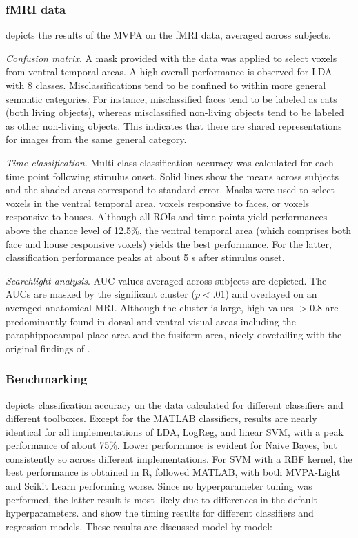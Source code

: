 \documentclass[utf8]{frontiersSCNS} %
\begin{document}
\subsubsection{fMRI data}

 depicts the results of the MVPA on the fMRI data, averaged across subjects.

\textit{Confusion matrix}. A mask provided with the data was applied to select voxels from ventral temporal areas.
A high overall performance is observed for LDA with 8 classes. Misclassifications tend to be confined to within more general semantic categories. For instance, misclassified faces tend to be labeled as cats (both living objects), whereas misclassified non-living objects tend to be labeled as other non-living objects. This indicates that there are shared representations for images from the same general category.

\textit{Time classification}. Multi-class classification accuracy was calculated for each time point following stimulus onset. Solid lines show the means across subjects and the shaded areas correspond to standard error. Masks were used to select voxels in the ventral temporal area, voxels responsive to faces, or voxels responsive to houses. Although all ROIs and time points yield performances above the chance level of 12.5\%, the ventral temporal area (which comprises both face and house responsive voxels) yields the best performance. For the latter, classification performance peaks at about 5 s after stimulus onset.

\textit{Searchlight analysis}. AUC values averaged across subjects are depicted. The AUCs are masked by the significant cluster ($p < .01$) and overlayed on an averaged anatomical MRI. Although the cluster is large, high values $>0.8$ are predominantly found in dorsal and ventral visual areas including the paraphippocampal place area and the fusiform area, nicely dovetailing with the original findings of \cite{Haxby2001}.

\subsubsection{Benchmarking}

 depicts classification accuracy on the \cite{Wakeman2015ADataset} data calculated for different classifiers and different toolboxes. Except for the MATLAB classifiers, results are nearly identical  for all implementations of LDA, LogReg, and linear SVM, with a peak performance of about 75\%. Lower performance is evident for Naive Bayes, but consistently so across different implementations. For SVM with a RBF kernel, the best performance is obtained in R, followed MATLAB, with both MVPA-Light and Scikit Learn performing worse. Since no hyperparameter tuning was performed, the latter result is most likely due to differences in the default hyperparameters.  and  show the timing results for different classifiers and regression models. These results are discussed model by model:
\end{document}
